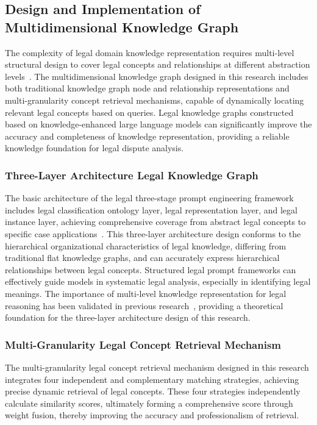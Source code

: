 \documentclass{article}
\theoremstyle{plain}
\theoremstyle{definition}
\begin{document}
\FloatBarrier
\subsection{Design and Implementation of Multidimensional Knowledge Graph}
\label{sec3.2}

The complexity of legal domain knowledge representation requires multi-level structural design to cover legal concepts and relationships at different abstraction levels~\cite{Liu2023}. The multidimensional knowledge graph designed in this research includes both traditional knowledge graph node and relationship representations and multi-granularity concept retrieval mechanisms, capable of dynamically locating relevant legal concepts based on queries. Legal knowledge graphs constructed based on knowledge-enhanced large language models can significantly improve the accuracy and completeness of knowledge representation, providing a reliable knowledge foundation for legal dispute analysis.

\subsubsection{Three-Layer Architecture Legal Knowledge Graph}
\label{sec3.2.1}

The basic architecture of the legal three-stage prompt engineering framework includes legal classification ontology layer, legal representation layer, and legal instance layer, achieving comprehensive coverage from abstract legal concepts to specific case applications~\cite{Chen2023}. This three-layer architecture design conforms to the hierarchical organizational characteristics of legal knowledge, differing from traditional flat knowledge graphs, and can accurately express hierarchical relationships between legal concepts. Structured legal prompt frameworks can effectively guide models in systematic legal analysis, especially in identifying legal meanings. The importance of multi-level knowledge representation for legal reasoning has been validated in previous research~\cite{Zheng2021}, providing a theoretical foundation for the three-layer architecture design of this research.

\subsubsection{Multi-Granularity Legal Concept Retrieval Mechanism}
\label{sec3.2.2}

The multi-granularity legal concept retrieval mechanism designed in this research integrates four independent and complementary matching strategies, achieving precise dynamic retrieval of legal concepts. These four strategies independently calculate similarity scores, ultimately forming a comprehensive score through weight fusion, thereby improving the accuracy and professionalism of retrieval.
\end{document}
